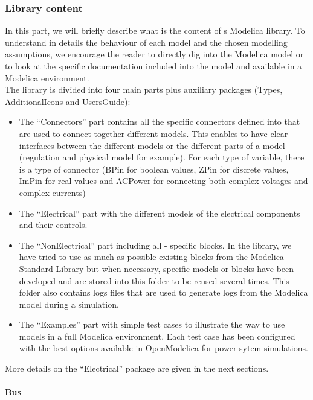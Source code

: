 \documentclass[a4paper, 12pt]{report}
\begin{document}
\subsubsection{Library content}

In this part, we will briefly describe what is the content of \Dynawo\textquotesingle s Modelica library. To understand in details the behaviour of each model and the chosen modelling assumptions, we encourage the reader to directly dig into the Modelica  model or to look at the specific documentation included into the model and available in a Modelica environment.\\

The \Dynawo library is divided into four main parts plus auxiliary packages (Types, AdditionalIcons and UsersGuide):
\begin{itemize}
\item The ``Connectors'' part contains all the specific connectors defined into \Dynawo that are used to connect together different models. This enables to have clear interfaces between the different models or the different parts of a model (regulation and physical model for example). For each type of variable, there is a type of connector (BPin for boolean values, ZPin for discrete values, ImPin for real values and ACPower for connecting both complex voltages and complex currents)
\item The ``Electrical'' part with the different models of the electrical components and their controls.
\item The ``NonElectrical'' part including all \Dynawo - specific blocks. In the library, we have tried to use as much as possible existing blocks from the Modelica Standard Library but when necessary, specific models or blocks have been developed and are stored into this folder to be reused several times. This folder also contains logs files that are used to generate logs from the Modelica model during a simulation.
\item The ``Examples'' part with simple test cases to illustrate the way to use \Dynawo models in a full Modelica environment. Each test case has been configured with the best options available in OpenModelica for power sytem simulations.
\end{itemize}

More details on the ``Electrical'' package are given in the next sections.

\paragraph{Bus}
~~\\
\end{document}
